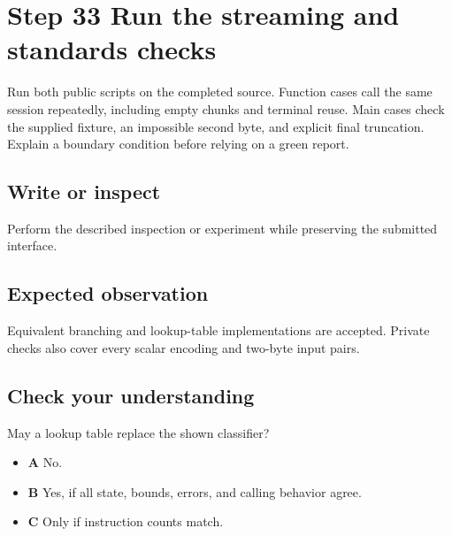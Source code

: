 \section{Step 33 Run the streaming and standards checks}\label{utf8-s33}

Run both public scripts on the completed source. Function cases call the same session repeatedly, including empty chunks and terminal reuse. Main cases check the supplied fixture, an impossible second byte, and explicit final truncation. Explain a boundary condition before relying on a green report.

\subsection{Write or inspect}
Perform the described inspection or experiment while preserving the submitted interface.

\subsection{Expected observation}
Equivalent branching and lookup-table implementations are accepted. Private checks also cover every scalar encoding and two-byte input pairs.

\subsection{Check your understanding}
May a lookup table replace the shown classifier?

\begin{itemize}
  \item \textbf{A} No.
  \item \textbf{B} Yes, if all state, bounds, errors, and calling behavior agree.
  \item \textbf{C} Only if instruction counts match.
\end{itemize}
